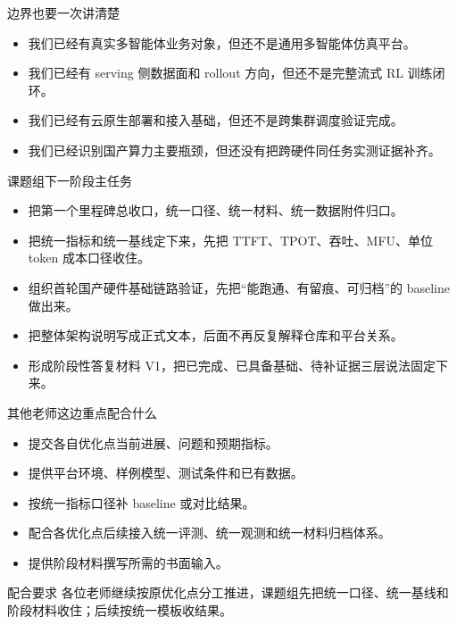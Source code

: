 \documentclass[aspectratio=169,11pt]{ctexbeamer}
\begin{document}
\begin{frame}{边界也要一次讲清楚}
  \begin{itemize}
    \item 我们已经有真实多智能体业务对象，但还不是通用多智能体仿真平台。
    \item 我们已经有 serving 侧数据面和 rollout 方向，但还不是完整流式 RL 训练闭环。
    \item 我们已经有云原生部署和接入基础，但还不是跨集群调度验证完成。
    \item 我们已经识别国产算力主要瓶颈，但还没有把跨硬件同任务实测证据补齐。
  \end{itemize}
\end{frame}

\begin{frame}{课题组下一阶段主任务}
  \begin{itemize}
    \item 把第一个里程碑总收口，统一口径、统一材料、统一数据附件归口。
    \item 把统一指标和统一基线定下来，先把 TTFT、TPOT、吞吐、MFU、单位 token 成本口径收住。
    \item 组织首轮国产硬件基础链路验证，先把“能跑通、有留痕、可归档”的 baseline 做出来。
    \item 把整体架构说明写成正式文本，后面不再反复解释仓库和平台关系。
    \item 形成阶段性答复材料 V1，把已完成、已具备基础、待补证据三层说法固定下来。
  \end{itemize}
\end{frame}

\begin{frame}{其他老师这边重点配合什么}
  \begin{itemize}
    \item 提交各自优化点当前进展、问题和预期指标。
    \item 提供平台环境、样例模型、测试条件和已有数据。
    \item 按统一指标口径补 baseline 或对比结果。
    \item 配合各优化点后续接入统一评测、统一观测和统一材料归档体系。
    \item 提供阶段材料撰写所需的书面输入。
  \end{itemize}

  \vspace{0.5em}
  \begin{block}{配合要求}
    各位老师继续按原优化点分工推进，课题组先把统一口径、统一基线和阶段材料收住；后续按统一模板收结果。
  \end{block}
\end{frame}
\end{document}
